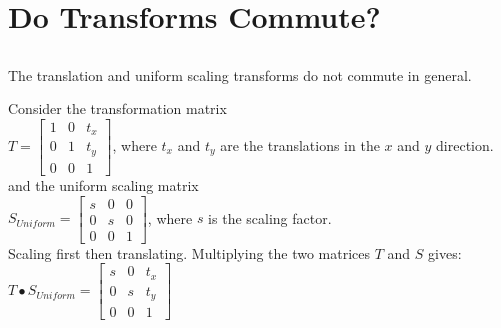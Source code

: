 \documentclass[a4paper,10pt]{scrartcl}
\title{}
\author{Philip Lee - 9999074932}
\begin{document}
\maketitle


\section{}

\section{}

\section{Do Transforms Commute?}

\subsection{}

The translation and uniform scaling transforms do not commute in general.

Consider the transformation matrix \\

$T = 
\begin{bmatrix}
    1       & 0 & t_x \\
    0       & 1 & t_y \\
    0       & 0 & 1 
\end{bmatrix}
$, where $t_x $ and $t_y$ are the translations in the $x$ and $y$ direction. \\

and the uniform scaling matrix \\

$S_{Uniform} = \begin{bmatrix}
    s       & 0 & 0 \\
    0       & s & 0 \\
    0       & 0 & 1     
 \end{bmatrix}
$, where $s$ is the scaling factor. \\

Scaling first then translating. Multiplying the two matrices $T$ and $S$ gives: \\

$T \bullet S_{Uniform} = \begin{bmatrix}
		  s & 0 & t_x \\
		  0 & s & t_y \\
		  0 & 0 & 1
               \end{bmatrix}
$ \\
\end{document}
